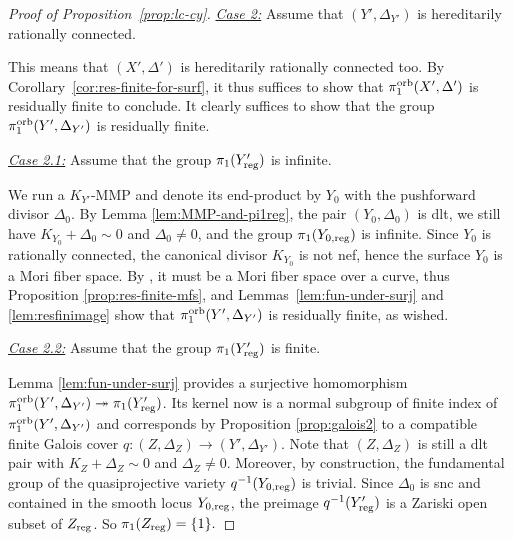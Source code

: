 \documentclass{amsart}
\theoremstyle{definition}
\theoremstyle{remark}
\numberwithin{equation}{section}
\begin{document}
\begin{proof}[Proof of Proposition~\ref{prop:lc-cy}]
\medskip

\noindent\underline{\textit{Case 2:}} Assume that $(Y',\Delta_{Y'})$ is hereditarily rationally connected. 

\medskip

This means that $(X',\Delta')$ is hereditarily rationally connected too. By Corollary~\ref{cor:res-finite-for-surf}, it thus suffices to show that $\pi_1^{\rm orb}(X',\Delta')$ is residually finite to conclude. It clearly suffices to show that the group $\pi_1^{\rm orb}(Y',\Delta_{Y'})$ is residually finite.

\medskip

\hfill \begin{minipage}{0.95\textwidth}
\noindent\underline{\textit{Case 2.1:}} Assume that the group $\pi_1(Y'_{\rm reg})$ is infinite.

\medskip

We run a $K_{Y'}$-MMP and denote its end-product by $Y_0$ with the pushforward divisor $\Delta_0$. By Lemma \ref{lem:MMP-and-pi1reg}, the pair $(Y_0,\Delta_0)$ is dlt, we still have $K_{Y_0}+\Delta_0\sim 0$ and $\Delta_0\neq 0$, and the group $\pi_1(Y_{0,{\rm reg}})$ is infinite. Since $Y_0$ is rationally connected, the canonical divisor $K_{Y_0}$ is not nef, hence the surface $Y_0$ is a Mori fiber space. By \cite[Theorem 2]{Bra20}, it must be a Mori fiber space over a curve, thus Proposition \ref{prop:res-finite-mfs}, and Lemmas~\ref{lem:fun-under-surj} and \ref{lem:resfinimage} show that $\pi_1^{\rm orb}(Y',\Delta_{Y'})$ is residually finite, as wished.
\end{minipage}

\medskip 

\hfill \begin{minipage}{0.95\textwidth}
\noindent\underline{\textit{Case 2.2:}} Assume that the group $\pi_1(Y'_{\rm reg})$ is finite.

\medskip

Lemma \ref{lem:fun-under-surj} provides a surjective homomorphism
$\pi_1^{\rm orb}(Y',\Delta_{Y'})\twoheadrightarrow \pi_1(Y'_{\rm reg})$. Its kernel now is a normal subgroup of finite index of $\pi_1^{\rm orb}(Y',\Delta_{Y'})$ and corresponds by Proposition \ref{prop:galois2} to a compatible finite Galois cover $q\colon (Z,\Delta_{Z})\rightarrow (Y',\Delta_{Y'})$. 
Note that $(Z,\Delta_Z)$ is still a dlt pair with $K_{Z}+\Delta_{Z}\sim 0$ and $\Delta_Z\neq 0$. Moreover, by construction, the fundamental group of the quasiprojective variety $q^{-1}(Y_{0,{\rm reg}})$ is trivial. Since $\Delta_0$ is snc and contained in the smooth locus $Y_{0,{\rm reg}}$, the preimage $q^{-1}(Y'_{\rm reg})$ is a Zariski open subset of $Z_{\rm reg}$. So $\pi_1(Z_{\rm reg})=\{1\}.$
\end{minipage}


\end{proof}
\end{document}
